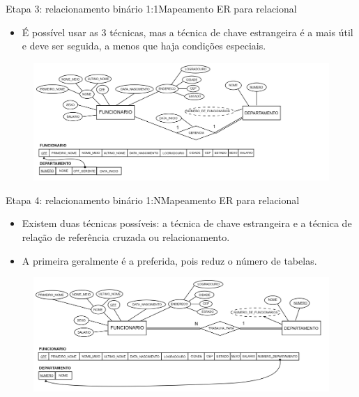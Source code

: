 \documentclass[t]{beamer}
\begin{document}

\begin{ftst}{Etapa 3: relacionamento binário 1:1}{Mapeamento ER para relacional}
\begin{itemize}
    \item É possível usar as 3 técnicas, mas a técnica de chave estrangeira é a mais útil e deve ser seguida, a menos que haja condições especiais.
\end{itemize}

\begin{figure}
    \centering
    \includegraphics[scale=0.12]{Figuras/03_05.png}
\end{figure}
\end{ftst}


\begin{ftst}{Etapa 4: relacionamento binário 1:N}{Mapeamento ER para relacional}
\small
\begin{itemize}
    \item Existem duas técnicas possíveis: a técnica de chave estrangeira e a técnica de relação de referência cruzada ou relacionamento. 
    \item A primeira geralmente é a preferida, pois reduz o número de tabelas.
\end{itemize}
\begin{figure}
    \centering
    \includegraphics[scale=0.11]{Figuras/03_09.png}
\end{figure}
\end{ftst}
\end{document}
